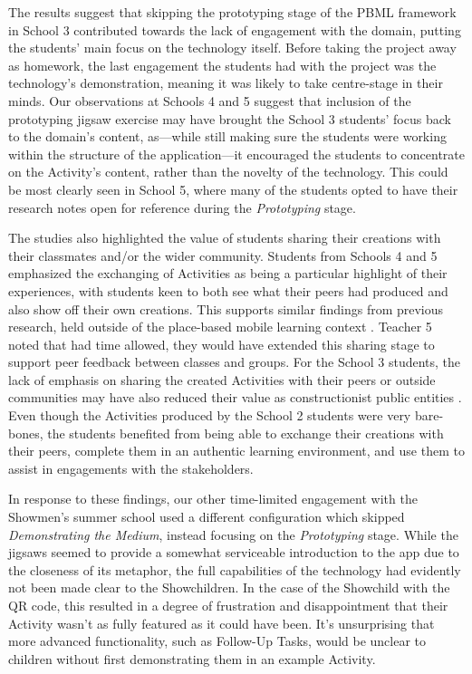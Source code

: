 The results suggest that skipping the prototyping stage of the PBML framework in School 3 contributed towards the lack of engagement with the domain, putting the students' main focus on the technology itself. Before taking the project away as homework, the last engagement the students had with the project was the technology's demonstration, meaning it was likely to take centre-stage in their minds. Our observations at Schools 4 and 5 suggest that inclusion of the prototyping jigsaw exercise may have brought the School 3 students' focus back to the domain's content, as---while still making sure the students were working within the structure of the application---it encouraged the students to concentrate on the Activity's content, rather than the novelty of the technology. This could be most clearly seen in School 5, where many of the students opted to have their research notes open for reference during the \textit{Prototyping} stage.

The studies also highlighted the value of students sharing their creations with their classmates and/or the wider community. Students from Schools 4 and 5 emphasized the exchanging of Activities as being a particular highlight of their experiences, with students keen to both see what their peers had produced and also show off their own creations. This supports similar findings from previous research, held outside of the place-based mobile learning context \citep{Sarangapani2018, Heslop2017}. Teacher 5 noted that had time allowed, they would have extended this sharing stage to support peer feedback between classes and groups. For the School 3 students, the lack of emphasis on sharing the created Activities with their peers or outside communities may have also reduced their value as constructionist public entities \citep{Papert1991}. Even though the Activities produced by the School 2 students were very bare-bones, the students benefited from being able to exchange their creations with their peers, complete them in an authentic learning environment, and use them to assist in engagements with the stakeholders.

In response to these findings, our other time-limited engagement with the Showmen's summer school used a different configuration which skipped \textit{Demonstrating the Medium}, instead focusing on the \textit{Prototyping} stage. While the jigsaws seemed to provide a somewhat serviceable introduction to the app due to the closeness of its metaphor, the full capabilities of the technology had evidently not been made clear to the Showchildren. In the case of the Showchild with the QR code, this resulted in a degree of frustration and disappointment that their Activity wasn't as fully featured as it could have been. It's unsurprising that more advanced functionality, such as Follow-Up Tasks, would be unclear to children without first demonstrating them in an example Activity.

